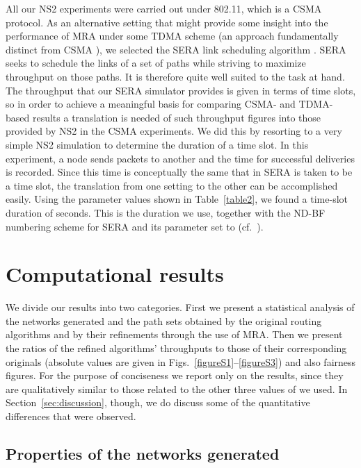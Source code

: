 \documentclass{article}
\begin{document}
All our NS2 experiments were carried out under 802.11, which is a CSMA protocol.
As an alternative setting that might provide some insight into the performance
of MRA under some TDMA scheme (an approach fundamentally distinct from CSMA
\cite{Gummalla2000}), we selected the SERA link scheduling algorithm
\cite{Fabio2012}. SERA seeks to schedule the links of a set of paths while
striving to maximize throughput on those paths. It is therefore quite well
suited to the task at hand. The throughput that our SERA simulator provides is
given in terms of time slots, so in order to achieve a meaningful basis for
comparing CSMA- and TDMA-based results a translation is needed of such
throughput figures into those provided by NS2 in the CSMA experiments. We did
this by resorting to a very simple NS2 simulation to determine the duration of
a time slot. In this experiment, a node sends packets to another and the time
for successful deliveries is recorded. Since this time is conceptually the same
that in SERA is taken to be a time slot, the translation from one setting to the
other can be accomplished easily. Using the parameter values shown in
Table~\ref{table2}, we found a time-slot duration of  seconds. This is
the duration we use, together with the ND-BF numbering scheme for SERA and its
 parameter set to  (cf.\ \cite{Fabio2012}).

\section{Computational results}\label{sec:results}

We divide our results into two categories. First we present a statistical
analysis of the networks generated and the path sets obtained by the original
routing algorithms and by their refinements through the use of MRA. Then we
present the ratios of the refined algorithms' throughputs to those of their
corresponding originals (absolute values are given in
Figs.~\ref{figureS1}--\ref{figureS3}) and also fairness figures. For the purpose
of conciseness we report only on the  results, since they are
qualitatively similar to those related to the other three values of  we used.
In Section~\ref{sec:discussion}, though, we do discuss some of the quantitative
differences that were observed.

\subsection{Properties of the networks generated}
\end{document}
